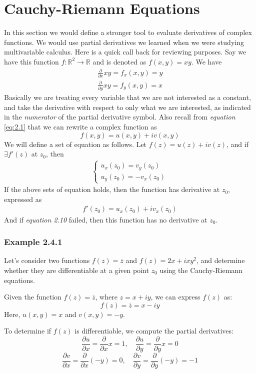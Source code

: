 \documentclass[12pt]{book}
\newcommand{\R}{\mathbb{R}}
\newcommand{\pypx}[2]{\frac{\partial #1}{\partial #2}}
\begin{document}
\section{Cauchy-Riemann Equations}
In this section we would define a stronger tool to evaluate derivatives of complex functions. We would use partial derivatives we learned when we were studying multivariable calculus. Here is a quick call back for reviewing purposes. Say we have this function $f \colon \R^2 \to \R$ and is denoted as $f(x,y) = xy$. We have
\begin{align}
\pypx{}{x}xy= f_x(x,y) = y\\
\pypx{}{y}xy = f_y(x,y) = x
\end{align}
Basically we are treating every variable that we are not interested as a constant, and take the derivative with respect to only what we are interested, as indicated in the \textit{numerator} of the partial derivative symbol.
Also recall from \textit{equation} \ref{eq:2.1} that we can rewrite a complex function as
\[
f(x,y) = u(x,y) + iv(x,y)
\]
We will define a set of equation as follows. Let $f(z) = u(z)+iv(z)$, and if $\exists f'(z)$ at $z_0$, then
\begin{align}
    \begin{cases}
        u_x(z_0) = v_y(z_0)\\
        u_y(z_0) = -v_x(z_0)
    \end{cases}
\end{align}
If the above sets of equation holds, then the function has derivative at $z_0$, expressed as
\begin{align}
    f'(z_0) = u_x(z_0) + iv_x(z_0)
\end{align}
And if \textit{equation 2.10} failed, then this function has no derivative at $z_0$.

\subsubsection{Example 2.4.1}

Let's consider two functions \( f(z) = \overline{z} \) and \( f(z) = 2x + ixy^2 \), and determine whether they are differentiable at a given point \( z_0 \) using the Cauchy-Riemann equations.


Given the function \( f(z) = \overline{z} \), where \( z = x + iy \), we can express \( f(z) \) as:
\[
f(z) = \overline{z} = x - iy
\]
Here, \( u(x,y) = x \) and \( v(x,y) = -y \).

To determine if \( f(z) \) is differentiable, we compute the partial derivatives:
\[
\pypx{u}{x} = \pypx{}{x}x = 1, \quad \pypx{u}{y} = \pypx{}{y}x = 0
\]
\[
\pypx{v}{x} = \pypx{}{x}(-y) = 0, \quad \pypx{v}{y} = \pypx{}{y}(-y) = -1
\]
\end{document}
